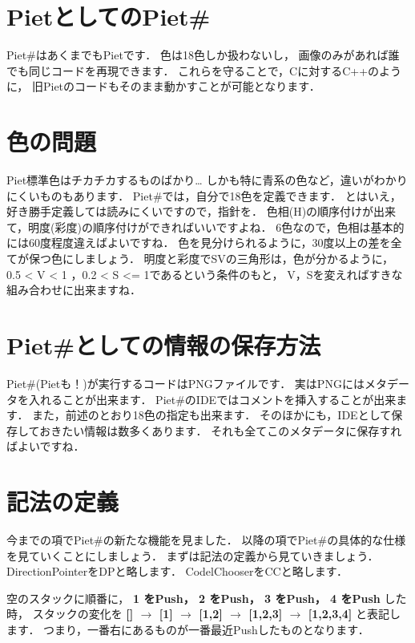 \section{PietとしてのPiet\#}

Piet\#はあくまでもPietです． 色は18色しか扱わないし，
画像のみがあれば誰でも同じコードを再現できます．
これらを守ることで，Cに対するC++のように，
旧Pietのコードもそのまま動かすことが可能となります．

\section{色の問題}

Piet標準色はチカチカするものばかり\ldots{}
しかも特に青系の色など，違いがわかりにくいものもあります．
Piet\#では，自分で18色を定義できます．
とはいえ，好き勝手定義しては読みにくいですので，指針を．
色相(H)の順序付けが出来て，明度(彩度)の順序付けができればいいですよね．
6色なので，色相は基本的には60度程度違えばよいですね．
色を見分けられるように，30度以上の差を全てが保つ色にしましょう．
明度と彩度でSVの三角形は，色が分かるように， 0.5 \textless{} V \textless{}
1 ，0.2 \textless{} S \textless{}= 1であるという条件のもと，
V，Sを変えればすきな組み合わせに出来ますね．

\section{Piet\#としての情報の保存方法}

Piet\#(Pietも！)が実行するコードはPNGファイルです．
実はPNGにはメタデータを入れることが出来ます．
Piet\#のIDEではコメントを挿入することが出来ます．
また，前述のとおり18色の指定も出来ます．
そのほかにも，IDEとして保存しておきたい情報は数多くあります．
それも全てこのメタデータに保存すればよいですね．

\section{記法の定義}

今までの項でPiet\#の新たな機能を見ました．
以降の項でPiet\#の具体的な仕様を見ていくことにしましょう．
まずは記法の定義から見ていきましょう． DirectionPointerをDPと略します．
CodelChooserをCCと略します．

空のスタックに順番に， \textbf{1 をPush， 2 をPush， 3 をPush， 4 をPush}
した時， スタックの変化を \textbf{{[}{]} $\to$ {[}1{]}
$\to$ {[}1,2{]} $\to$ {[}1,2,3{]} $\to$
{[}1,2,3,4{]}} と表記します．
つまり，一番右にあるものが一番最近Pushしたものとなります．


